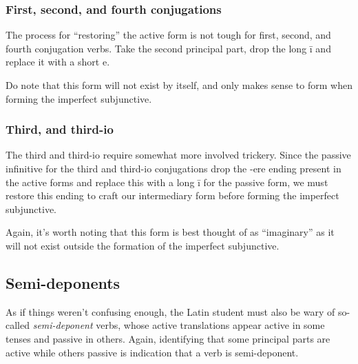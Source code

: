 \subsubsection{First, second, and fourth conjugations}
The process for ``restoring'' the active form is not tough
for first, second, and fourth conjugation verbs.  Take the
second principal part, drop the long \=i and replace it
with a short e.

Do note that this form will not exist by itself, and only
makes sense to form when forming the imperfect subjunctive.

%
%
%

\subsubsection{Third, and third-io}
The third and third-io require somewhat more involved
trickery.  Since the passive infinitive for the third and
third-io conjugations drop the -ere ending present in the
active forms and replace this with a long \=i for the
passive form, we must restore this ending to craft our
intermediary form before forming the imperfect subjunctive.

Again, it's worth noting that this form is best thought of
as ``imaginary'' as it will not exist outside the formation
of the imperfect subjunctive.

%

\subsection{Semi-deponents}
As if things weren't confusing enough, the Latin student
must also be wary of so-called \emph{semi-deponent} verbs,
whose active translations appear active in some tenses and
passive in others.  Again, identifying that some principal
parts are active while others passive is indication that a
verb is semi-deponent.

%
%
%
%
% 


